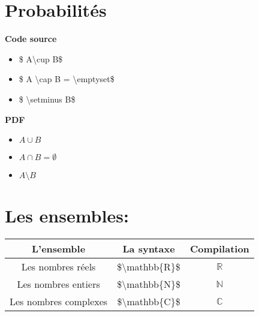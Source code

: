 \documentclass[a4paper,12pt]{article}
\begin{document}
\section{Probabilit\'es}
\begin{minipage}[t]{8cm}	
\textbf{Code source}\\
\begin{itemize}
\item\$ A\textbackslash cup B\$
\item \$ A \textbackslash cap B = \textbackslash emptyset\$
\item \$ \textbackslash setminus B\$
\end{itemize}
\end{minipage}
\begin{minipage}[t]{8cm}
\textbf{PDF}\\
\begin{itemize}
\item $A \cup B$
\item $A \cap B=\emptyset$
\item $A \setminus B$
\end{itemize}
\end{minipage}
\section{Les ensembles:}
\begin{tabular}{|c|c|c|}
\hline L'ensemble & La syntaxe & Compilation\\
\hline Les nombres r\'eels & \$\textbackslash mathbb\{R\}\$ & $\mathbb{R}$ \\
\hline Les nombres entiers & \$\textbackslash mathbb\{N\}\$ & $\mathbb{N}$ \\
\hline Les nombres complexes & \$\textbackslash mathbb\{C\}\$ & $\mathbb{C}$ \\
\hline
\end{tabular}
\end{document}
